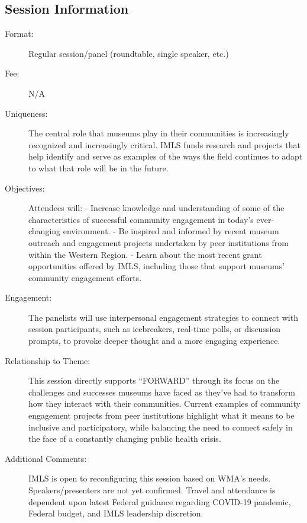 \documentclass{report}
\begin{document}
              \subsection*{Session Information}
                \begin{description}
                  \item [Format:] Regular session/panel (roundtable, single speaker, etc.)
							    
								  \item [Fee:]N/A
							     
							    \item [Uniqueness:]The central role that museums play in their communities is increasingly recognized and increasingly critical. IMLS funds research and projects that help identify and serve as examples of the ways the field continues to adapt to what that role will be in the future.
							    \item [Objectives:]Attendees will:
- Increase knowledge and understanding of some of the characteristics of successful community engagement in today’s ever-changing environment.
- Be inspired and informed by recent museum outreach and engagement projects undertaken by peer institutions from within the Western Region.
- Learn about the most recent grant opportunities offered by IMLS, including those that support museums’ community engagement efforts.
							    \item [Engagement:]The panelists will use interpersonal engagement strategies to connect with session participants, such as icebreakers, real-time polls, or discussion prompts, to provoke deeper thought and a more engaging experience.
							    \item [Relationship to Theme:]This session directly supports “FORWARD” through its focus on the challenges and successes museums have faced as they’ve had to transform how they interact with their communities. Current examples of community engagement projects from peer institutions highlight what it means to be inclusive and participatory, while balancing the need to connect safely in the face of a constantly changing public health crisis.
							    
                    \item [Additional Comments: ]IMLS is open to reconfiguring this session based on WMA’s needs. 
Speakers/presenters are not yet confirmed. 
Travel and attendance is dependent upon latest Federal guidance regarding COVID-19 pandemic, Federal budget, and IMLS leadership discretion.

                \end{description}
\end{document}
